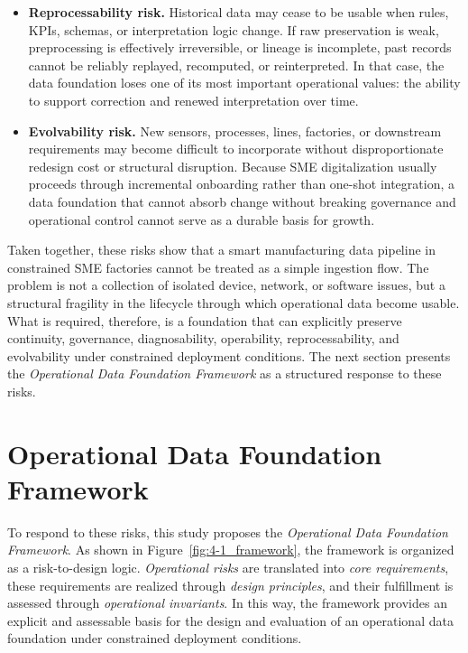 \documentclass[systems,article,submit,pdftex,moreauthors]{Definitions/mdpi}
\begin{document}
\begin{itemize}[leftmargin=1.5em]
    \item[\textbf{RSK5.}] \textbf{Reprocessability risk.} Historical data may cease to be usable when rules, KPIs, schemas, or interpretation logic change. If raw preservation is weak, preprocessing is effectively irreversible, or lineage is incomplete, past records cannot be reliably replayed, recomputed, or reinterpreted. In that case, the data foundation loses one of its most important operational values: the ability to support correction and renewed interpretation over time.

    \item[\textbf{RSK6.}] \textbf{Evolvability risk.} New sensors, processes, lines, factories, or downstream requirements may become difficult to incorporate without disproportionate redesign cost or structural disruption. Because SME digitalization usually proceeds through incremental onboarding rather than one-shot integration, a data foundation that cannot absorb change without breaking governance and operational control cannot serve as a durable basis for growth.
\end{itemize}

Taken together, these risks show that a smart manufacturing data pipeline in constrained SME factories cannot be treated as a simple ingestion flow. The problem is not a collection of isolated device, network, or software issues, but a structural fragility in the lifecycle through which operational data become usable. What is required, therefore, is a foundation that can explicitly preserve continuity, governance, diagnosability, operability, reprocessability, and evolvability under constrained deployment conditions. The next section presents the \emph{Operational Data Foundation Framework} as a structured response to these risks.

\section{Operational Data Foundation Framework}
\label{sec:odff}

To respond to these risks, this study proposes the \emph{Operational Data Foundation Framework}. As shown in Figure~\ref{fig:4-1_framework}, the framework is organized as a risk-to-design logic. \emph{Operational risks} are translated into \emph{core requirements}, these requirements are realized through \emph{design principles}, and their fulfillment is assessed through \emph{operational invariants}. In this way, the framework provides an explicit and assessable basis for the design and evaluation of an operational data foundation under constrained deployment conditions.
\end{document}
